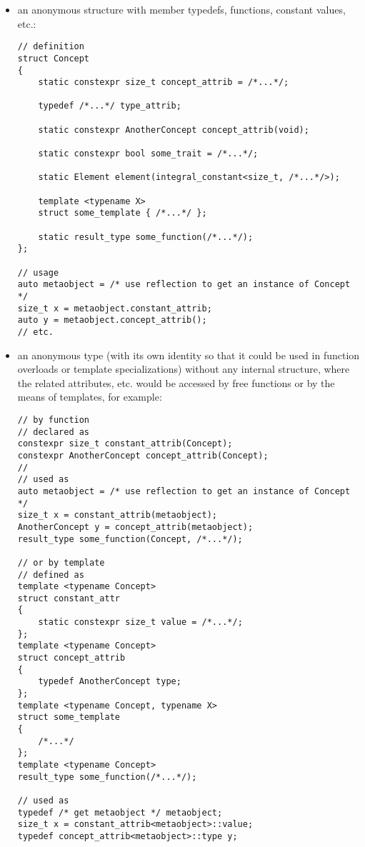 \begin{itemize}
\item an anonymous structure with member typedefs, functions, constant values, etc.:
\begin{verbatim}
// definition
struct Concept
{
	static constexpr size_t concept_attrib = /*...*/;

	typedef /*...*/ type_attrib;

	static constexpr AnotherConcept concept_attrib(void);

	static constexpr bool some_trait = /*...*/;

	static Element element(integral_constant<size_t, /*...*/>);

	template <typename X>
	struct some_template { /*...*/ };

	static result_type some_function(/*...*/);
};

// usage
auto metaobject = /* use reflection to get an instance of Concept */
size_t x = metaobject.constant_attrib;
auto y = metaobject.concept_attrib();
// etc.
\end{verbatim}

\item an anonymous type (with its own identity so that it could be used
in function overloads or template specializations) without any internal structure,
where the related attributes, etc. would be accessed by free functions or
by the means of templates, for example:
\begin{verbatim}
// by function
// declared as
constexpr size_t constant_attrib(Concept);
constexpr AnotherConcept concept_attrib(Concept);
//
// used as
auto metaobject = /* use reflection to get an instance of Concept */
size_t x = constant_attrib(metaobject);
AnotherConcept y = concept_attrib(metaobject);
result_type some_function(Concept, /*...*/);

// or by template
// defined as
template <typename Concept>
struct constant_attr
{
	static constexpr size_t value = /*...*/;
};
template <typename Concept>
struct concept_attrib
{
	typedef AnotherConcept type;
};
template <typename Concept, typename X>
struct some_template
{
	/*...*/
};
template <typename Concept>
result_type some_function(/*...*/);

// used as
typedef /* get metaobject */ metaobject;
size_t x = constant_attrib<metaobject>::value;
typedef concept_attrib<metaobject>::type y;
\end{verbatim}

\end{itemize}

